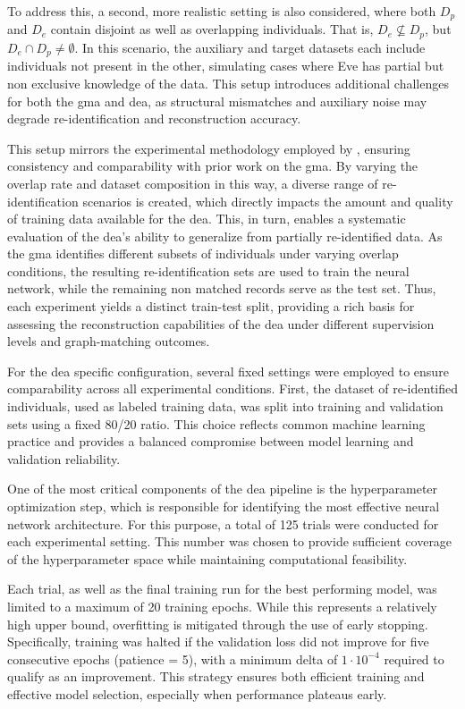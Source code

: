 To address this, a second, more realistic setting is also considered, where both $D_p$ and $D_e$ contain disjoint as well as overlapping individuals.
That is, $D_e \nsubseteq D_p$, but $D_e \cap D_p \neq \emptyset$.
In this scenario, the auxiliary and target datasets each include individuals not present in the other, simulating cases where Eve has partial but non exclusive knowledge of the data.
This setup introduces additional challenges for both the \ac{gma} and \ac{dea}, as structural mismatches and auxiliary noise may degrade re-identification and reconstruction accuracy.

This setup mirrors the experimental methodology employed by \cite{schaefer2024}, ensuring consistency and comparability with prior work on the \ac{gma}.
By varying the overlap rate and dataset composition in this way, a diverse range of re-identification scenarios is created, which directly impacts the amount and quality of training data available for the \ac{dea}.
This, in turn, enables a systematic evaluation of the \ac{dea}'s ability to generalize from partially re-identified data.
As the \ac{gma} identifies different subsets of individuals under varying overlap conditions, the resulting re-identification sets are used to train the neural network, while the remaining non matched records serve as the test set.
Thus, each experiment yields a distinct train-test split, providing a rich basis for assessing the reconstruction capabilities of the \ac{dea} under different supervision levels and graph-matching outcomes.

For the \ac{dea} specific configuration, several fixed settings were employed to ensure comparability across all experimental conditions.
First, the dataset of re-identified individuals, used as labeled training data, was split into training and validation sets using a fixed 80/20 ratio.
This choice reflects common machine learning practice and provides a balanced compromise between model learning and validation reliability.

One of the most critical components of the \ac{dea} pipeline is the hyperparameter optimization step, which is responsible for identifying the most effective neural network architecture.
For this purpose, a total of 125 trials were conducted for each experimental setting.
This number was chosen to provide sufficient coverage of the hyperparameter space while maintaining computational feasibility.

Each trial, as well as the final training run for the best performing model, was limited to a maximum of 20 training epochs.
While this represents a relatively high upper bound, overfitting is mitigated through the use of early stopping.
Specifically, training was halted if the validation loss did not improve for five consecutive epochs (patience = 5), with a minimum delta of $1 \cdot 10^{-4}$ required to qualify as an improvement.
This strategy ensures both efficient training and effective model selection, especially when performance plateaus early.

